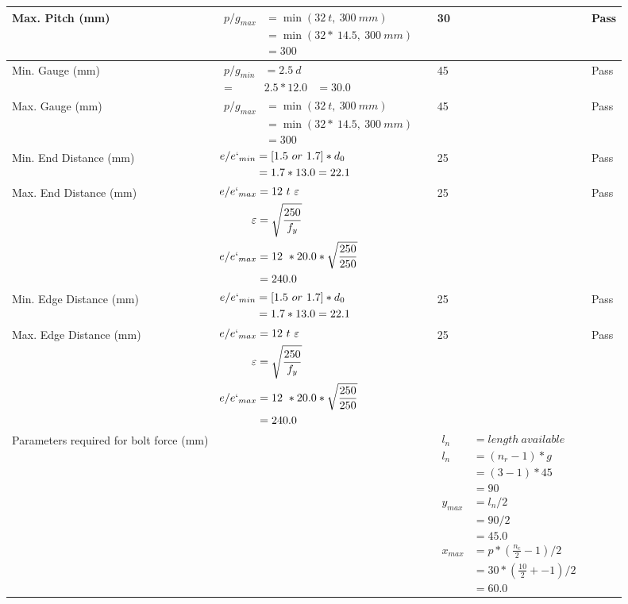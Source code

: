 \documentclass{article}%
\begin{document}
\begin{longtable}{|p{4cm}|p{5cm}|p{5.5cm}|p{1.5cm}|}
Max. Pitch (mm)&$\begin{aligned}p/g_{max} &=\min(32~t,~300~mm)&\\ &=\min(32 *~14.5,~ 300 ~mm)\\&=300\end{aligned}$&30&Pass\\%
\hline%
Min. Gauge (mm)&$\begin{aligned}p/g_{min}&= 2.5 ~ d&\\ =&2.5*12.0&=30.0\end{aligned}$&45&Pass\\%
\hline%
Max. Gauge (mm)&$\begin{aligned}p/g_{max} &=\min(32~t,~300~mm)&\\ &=\min(32 *~14.5,~ 300 ~mm)\\&=300\end{aligned}$&45&Pass\\%
\hline%
Min. End Distance (mm)&$\begin{aligned}e/e`_{min} &=[1.5~or~ 1.7] * d_0\\ &=1.7*13.0=22.1 \end{aligned}$&25&Pass\\%
\hline%
Max. End Distance (mm)&$\begin{aligned}e/e`_{max} &= 12~ t~ \varepsilon&\\ \varepsilon &= \sqrt{\frac{250}{f_y}}\\ e/e`_{max}&=12 ~*20.0*\sqrt{\frac{250}{250}}\\ &=240.0\\ \end{aligned}$&25&Pass\\%
\hline%
Min. Edge Distance (mm)&$\begin{aligned}e/e`_{min} &=[1.5~or~ 1.7] * d_0\\ &=1.7*13.0=22.1 \end{aligned}$&25&Pass\\%
\hline%
Max. Edge Distance (mm)&$\begin{aligned}e/e`_{max} &= 12~ t~ \varepsilon&\\ \varepsilon &= \sqrt{\frac{250}{f_y}}\\ e/e`_{max}&=12 ~*20.0*\sqrt{\frac{250}{250}}\\ &=240.0\\ \end{aligned}$&25&Pass\\%
\hline%
Parameters required for bolt force (mm)&&$\begin{aligned} l_n~~~ &= length~available \\  l_n~~~ &= (n_r - 1) * g\\  &= (3 - 1) *45\\  & =90\\  y_{max} &= l_n / 2\\  &= 90 / 2 \\  & =45.0\\ x_{max} &= p * (\frac{n_c}{2} - 1) / 2 \\  &= 30 * (\frac{10}{2} + - 1) / 2 \\  & =60.0\end{aligned}$&\\%

\end{longtable}
\end{document}
